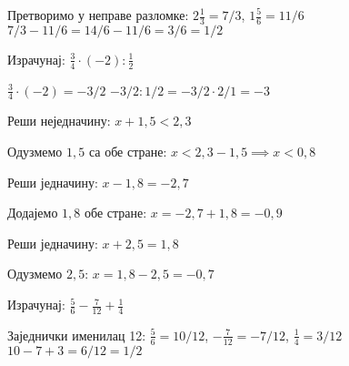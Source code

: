 \documentclass[11pt,a5paper,addpoints]{exam}
\begin{document}
\begin{questions}
\begin{solution}[\stretch 2]
Претворимо у неправе разломке: $2\frac{1}{3}=7/3$, $1\frac{5}{6}=11/6$  
$7/3-11/6=14/6-11/6=3/6=1/2$
\end{solution}

\question[3]
Израчунај: $\frac{3}{4}\cdot(-2):\frac{1}{2}$

\begin{solution}[\stretch 2]
$\frac{3}{4}\cdot(-2)=-3/2$  
$-3/2 : 1/2 = -3/2 \cdot 2/1 = -3$
\end{solution}

\question[3]
Реши неједначину: $x+1,5<2,3$

\begin{solution}[\stretch 2]
Одузмемо $1,5$ са обе стране:  
$x<2,3-1,5\implies x<0,8$
\end{solution}

\ifprintanswers\else\newpage\fi

\question[3]
Реши једначину: $x-1,8=-2,7$

\begin{solution}[\stretch 2]
Додајемо $1,8$ обе стране: $x=-2,7+1,8=-0,9$
\end{solution}

\question[3]
Реши једначину: $x+2,5=1,8$

\begin{solution}[\stretch 2]
Одузмемо $2,5$: $x=1,8-2,5=-0,7$
\end{solution}

\question[3]
Израчунај: $\frac{5}{6}-\frac{7}{12}+\frac{1}{4}$

\begin{solution}[\stretch 2]
Заједнички именилац 12: $\frac{5}{6}=10/12$, $-\frac{7}{12}=-7/12$, $\frac{1}{4}=3/12$  
$10-7+3=6/12=1/2$
\end{solution}

\end{questions}
\end{document}
